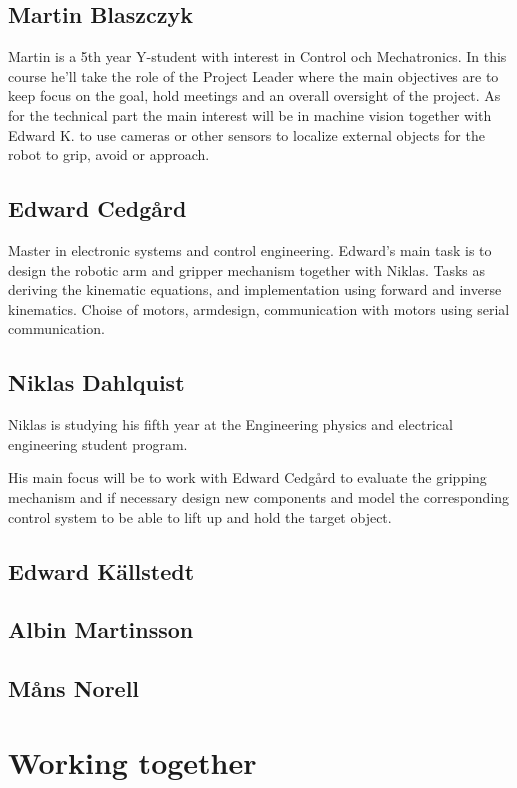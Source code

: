 
\section*{Martin Blaszczyk}
Martin is a 5th year Y-student with interest in Control och Mechatronics. 
In this course he'll take the role of the Project Leader where the main objectives
are to keep focus on the goal, hold meetings and an overall oversight of the project. 
As for the technical part the main interest will be in machine vision together with
Edward K. to use cameras or other sensors to localize external objects for the 
robot to grip, avoid or approach.

\section*{Edward Cedgård}

Master in  electronic systems and control engineering.
Edward's main task is to design the robotic arm and gripper mechanism together with Niklas. 
Tasks as deriving the kinematic equations, and implementation using forward and inverse kinematics.
Choise of motors, armdesign, communication with motors using serial communication. 

\section*{Niklas Dahlquist}
Niklas is studying his fifth year at the Engineering physics and electrical engineering student program.

His main focus will be to work with Edward Cedgård to evaluate the gripping mechanism and if necessary design new components and model the corresponding control system to be able to lift up and hold the target object.
\section*{Edward Källstedt}


\section*{Albin Martinsson}


\section*{Måns Norell}


\chapter{Working together}

